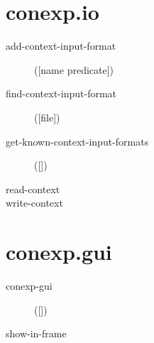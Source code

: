 \section{conexp.io}
\begin{description}
  \item[add-context-input-format]
([name predicate])



  \item[find-context-input-format]
([file])



  \item[get-known-context-input-formats]
([])



  \item[read-context]




  \item[write-context]




\end{description}

\section{conexp.gui}
\begin{description}
  \item[conexp-gui]
([])



  \item[show-in-frame]




\end{description}

